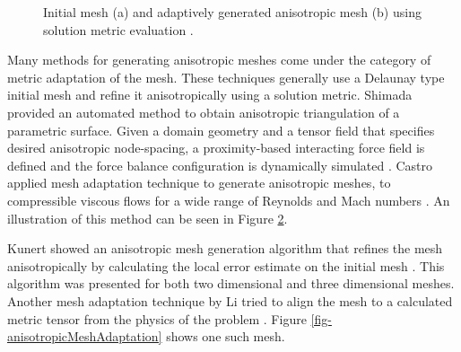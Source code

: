 \begin{figure}
\begin{minipage}[b]{.55\textwidth}
\begin{subfigure}{\linewidth}
		\caption{}
	\label{fig-castro}
	\end{subfigure}
	\caption{Initial mesh (a) and adaptively generated anisotropic mesh (b) using solution metric evaluation	\cite{castro1997anisotropic}.}
\end{minipage}
\end{figure}

Many methods for generating anisotropic meshes come under the category of metric adaptation of the mesh. These techniques generally use a Delaunay type initial mesh and refine it anisotropically using a solution metric. Shimada \etal provided an automated method to obtain anisotropic triangulation of a parametric surface. Given a domain geometry and a tensor field that specifies desired anisotropic node-spacing, a proximity-based interacting force field is defined and the force balance configuration is dynamically simulated \cite{shimada1997anisotropic}. Castro \etal applied mesh adaptation technique to generate anisotropic meshes, to compressible viscous flows for a wide range of Reynolds and Mach numbers \cite{castro1997anisotropic}. An illustration of this method can be seen in Figure \ref{fig-castro}. 

Kunert \etal showed an anisotropic mesh generation algorithm that refines the mesh anisotropically by calculating the local error estimate on the initial mesh \cite{kunert2002toward}. This algorithm was presented for both two dimensional and three dimensional meshes. Another mesh adaptation technique by Li \etal tried to align the mesh to a calculated metric tensor from the physics of the problem \cite{li2010anisotropic}. Figure \ref{fig-anisotropicMeshAdaptation} shows one such mesh.

